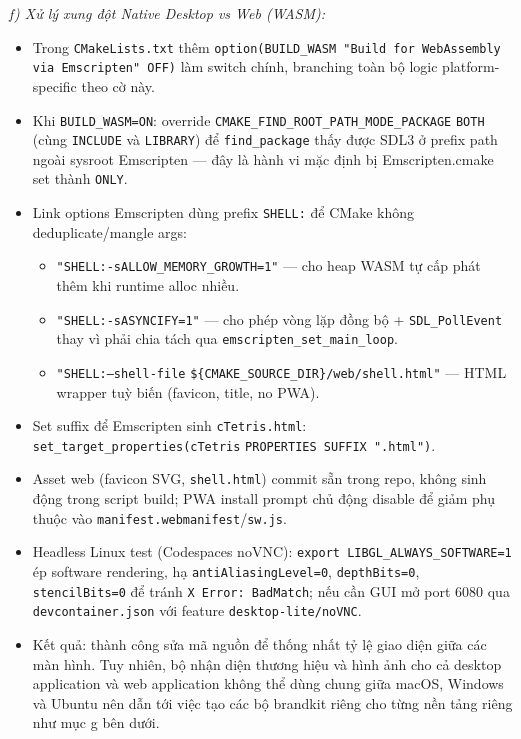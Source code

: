 \documentclass[12pt,a4paper]{article}
\begin{document}
\textit{f) Xử lý xung đột Native Desktop vs Web (WASM):}
\begin{itemize}
    \item Trong \texttt{CMakeLists.txt} thêm \texttt{option(BUILD\_WASM "Build for WebAssembly via Emscripten" OFF)} làm switch chính, branching toàn bộ logic platform-specific theo cờ này.
    \item Khi \texttt{BUILD\_WASM=ON}: override \texttt{CMAKE\_FIND\_ROOT\_PATH\_MODE\_PACKAGE} \texttt{BOTH} (cùng \texttt{INCLUDE} và \texttt{LIBRARY}) để \texttt{find\_package} thấy được SDL3 ở prefix path ngoài sysroot Emscripten — đây là hành vi mặc định bị Emscripten.cmake set thành \texttt{ONLY}.
    \item Link options Emscripten dùng prefix \texttt{SHELL:} để CMake không deduplicate/mangle args:
    \begin{itemize}
        \item \texttt{"SHELL:-sALLOW\_MEMORY\_GROWTH=1"} — cho heap WASM tự cấp phát thêm khi runtime alloc nhiều.
        \item \texttt{"SHELL:-sASYNCIFY=1"} — cho phép vòng lặp đồng bộ + \texttt{SDL\_PollEvent} thay vì phải chia tách qua \texttt{emscripten\_set\_main\_loop}.
        \item \texttt{"SHELL:--shell-file} \texttt{\$\{CMAKE\_SOURCE\_DIR\}/\allowbreak web/\allowbreak shell.html"} — HTML wrapper tuỳ biến (favicon, title, no PWA).
    \end{itemize}
    \item Set suffix để Emscripten sinh \texttt{cTetris.html}: \texttt{set\_target\_properties(cTetris} \texttt{PROPERTIES SUFFIX ".html")}.
    \item Asset web (favicon SVG, \texttt{shell.html}) commit sẵn trong repo, không sinh động trong script build; PWA install prompt chủ động disable để giảm phụ thuộc vào \texttt{manifest.webmanifest}/\texttt{sw.js}.
    \item Headless Linux test (Codespaces noVNC): \texttt{export LIBGL\_ALWAYS\_SOFTWARE=1} ép software rendering, hạ \texttt{antiAliasingLevel=0}, \texttt{depthBits=0}, \texttt{stencilBits=0} để tránh \texttt{X Error: BadMatch}; nếu cần GUI mở port 6080 qua \texttt{devcontainer.json} với feature \texttt{desktop-lite/noVNC}.
    \item Kết quả: thành công sửa mã nguồn để thống nhất tỷ lệ giao diện giữa các màn hình. Tuy nhiên, bộ nhận diện thương hiệu và hình ảnh cho cả desktop application và web application không thể dùng chung giữa macOS, Windows và Ubuntu nên dẫn tới việc tạo các bộ brandkit riêng cho từng nền tảng riêng như mục g bên dưới.
\end{itemize}
\end{document}

